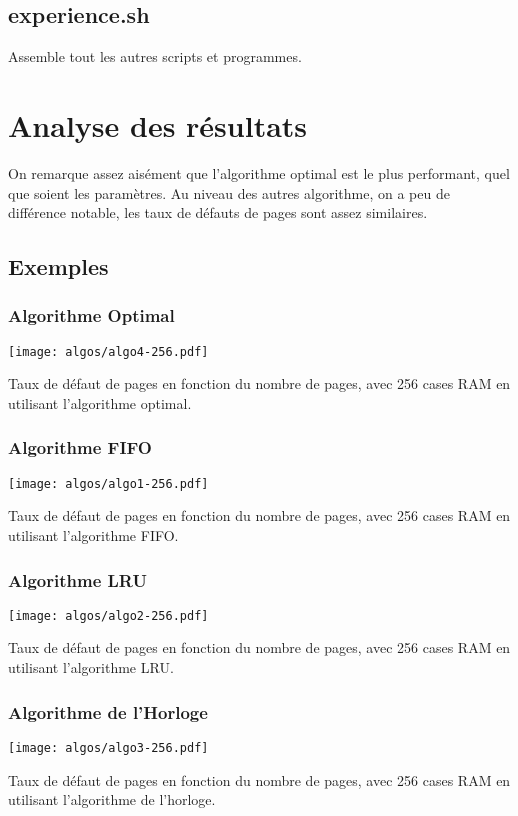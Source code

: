 \documentclass[a4paper, 12pt]{article}
\begin{document}
\subsection{experience.sh}
Assemble tout les autres scripts et programmes.

\newpage

\section{Analyse des résultats}
On remarque assez aisément que l'algorithme optimal est le plus performant, quel que soient les paramètres.
Au niveau des autres algorithme, on a peu de différence notable, les taux de défauts de pages sont assez similaires.

\subsection{Exemples}
\subsubsection{Algorithme Optimal}

\texttt{[image: algos/algo4-256.pdf]}

Taux de défaut de pages en fonction du nombre de pages, avec 256 cases RAM en utilisant l'algorithme optimal.

\subsubsection{Algorithme FIFO}

\texttt{[image: algos/algo1-256.pdf]}

Taux de défaut de pages en fonction du nombre de pages, avec 256 cases RAM en utilisant l'algorithme FIFO.

\subsubsection{Algorithme LRU}

\texttt{[image: algos/algo2-256.pdf]}

Taux de défaut de pages en fonction du nombre de pages, avec 256 cases RAM en utilisant l'algorithme LRU.

\subsubsection{Algorithme de l'Horloge}

\texttt{[image: algos/algo3-256.pdf]}

Taux de défaut de pages en fonction du nombre de pages, avec 256 cases RAM en utilisant l'algorithme de l'horloge.
\end{document}

